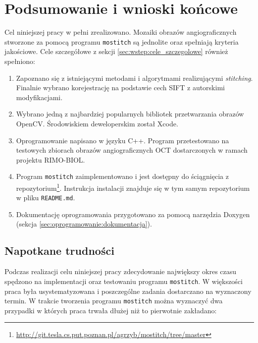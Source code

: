 %
\chapter{Podsumowanie i wnioski końcowe}
\label{sec:podsumowanie_i_wnioski}

Cel niniejszej pracy w pełni zrealizowano. Mozaiki obrazów angiograficznych stworzone za pomocą programu \texttt{mostitch} są jednolite oraz spełniają kryteria jakościowe. Cele szczegółowe z sekcji \ref{sec:wstep:cele_szczegolowe} również spełniono:

\begin{enumerate}
\item Zapoznano się z istniejącymi metodami i algorytmami realizującymi \textit{stitching}. Finalnie wybrano korejestrację na podstawie cech SIFT z autorskimi modyfikacjami.
\item Wybrano jedną z najbardziej popularnych bibliotek przetwarzania obrazów OpenCV. Środowiskiem deweloperskim został Xcode.
\item Oprogramowanie napisano w języku C++. Program przetestowano na testowych zbiorach obrazów angiograficznych OCT dostarczonych w ramach projektu RIMO-BIOL.
\item Program \texttt{mostitch} zaimplementowano i jest dostępny do ściągnięcia z repozytorium\footnote{\url{http://git.tesla.cs.put.poznan.pl/agrzyb/mostitch/tree/master}}. Instrukcja instalacji znajduje się w tym samym repozytorium w pliku \texttt{README.md}.
\item Dokumentację oprogramowania przygotowano za pomocą narzędzia Doxygen (sekcja \ref{sec:oprogramowanie:dokumentacja}).
\end{enumerate}

\section{Napotkane trudności}
\label{sec:podsumowanie_i_wnioski:napotkane_trudnosci}

Podczas realizacji celu niniejszej pracy zdecydowanie największy okres czasu spędzono na implementacji oraz testowaniu programu \texttt{mostitch}. W większości praca była usystematyzowana i poszczególne zadania dostarczano na wyznaczony termin. W trakcie tworzenia programu \texttt{mostitch} można wyznaczyć dwa przypadki w których praca trwała dłużej niż to pierwotnie zakładano:

